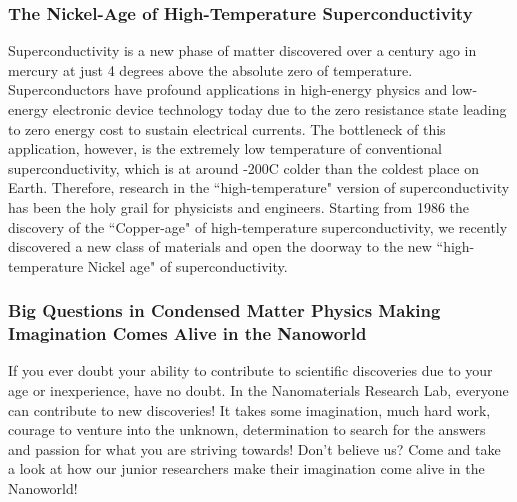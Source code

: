 \documentclass[12pt,a4paper]{article}
\begin{document}
\subsubsection{The Nickel-Age of High-Temperature Superconductivity}
Superconductivity is a new phase of matter discovered over a century ago in mercury at just 4 degrees above the absolute zero of temperature. Superconductors have profound applications in high-energy physics and low-energy electronic device technology today due to the zero resistance state leading to zero energy cost to sustain electrical currents. The bottleneck of this application, however, is the extremely low temperature of conventional superconductivity, which is at around -200\degree C colder than the coldest place on Earth. Therefore, research in the ``high-temperature" version of superconductivity has been the holy grail for physicists and engineers. Starting from 1986 the discovery of the ``Copper-age" of high-temperature superconductivity, we recently discovered a new class of materials and open the doorway to the new ``high-temperature Nickel age" of superconductivity.

\subsubsection{Big Questions in Condensed Matter Physics Making Imagination Comes Alive in the Nanoworld}
If you ever doubt your ability to contribute to scientific discoveries due to your age or inexperience, have no doubt. In the Nanomaterials Research Lab, everyone can contribute to new discoveries! It takes some imagination, much hard work, courage to venture into the unknown, determination to search for the answers and passion for what you are striving towards! Don't believe us? Come and take a look at how our junior researchers make their imagination come alive in the Nanoworld!
\end{document}

